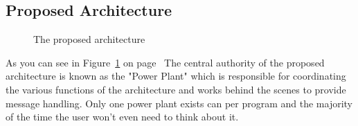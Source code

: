 \documentclass[english,12pt]{scrartcl}
\begin{document}
            
        \subsection{Proposed Architecture}
            \begin{figure}[h]
                \centering
                \caption {The proposed architecture}
                \label{fig:HighLevelProposedArchitecture}
            \end{figure}

            As you can see in Figure~\ref{fig:HighLevelProposedArchitecture} on
            page~\pageref{fig:HighLevelProposedArchitecture} 
            The central authority of the proposed architecture is known as the "Power Plant" which
            is responsible for coordinating the various functions of the architecture and works
            behind the scenes to provide message handling. Only one power plant exists can per
            program and the majority of the time the user won't even need to think about it. 
            
\end{document}

